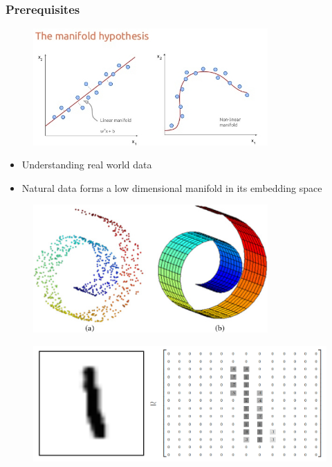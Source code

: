 \documentclass{Bredelebeamer}
\begin{document}
\begin{frame}
\frametitle{Prerequisites}
\begin{figure}[h!]
	\centering
	\includegraphics[width=0.8\textwidth]{manifold_hypothesis.jpg}
\end{figure}
\begin{itemize}[<+(1)->]
	\item Understanding real world data
	\item Natural data forms a low dimensional manifold in its embedding space
\end{itemize}

\end{frame}
\begin{frame}
\begin{figure}[h!]
	\centering
	\includegraphics[width=0.8\textwidth]{swiss_roll.jpg}
\end{figure}

\end{frame}

\begin{frame}
\begin{figure}[h!]
	\centering
	\includegraphics[width=\textwidth]{mnist_pixel_space.png}
\end{figure}

\end{frame}
\end{document}
